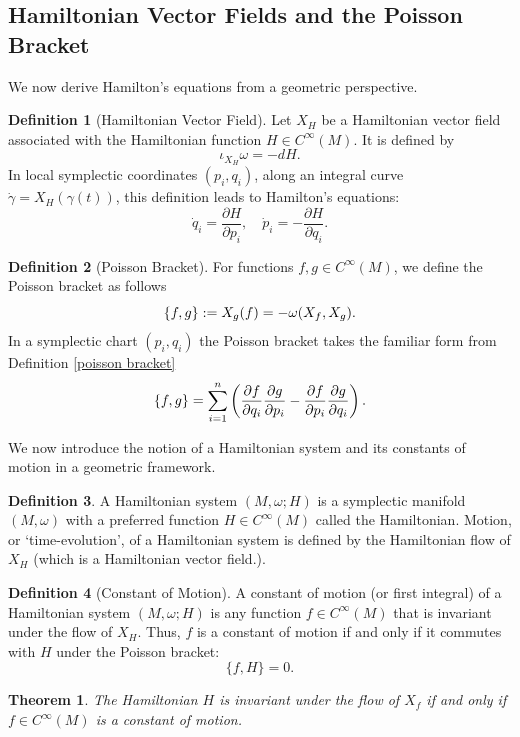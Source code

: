 \documentclass[12pt,oneside]{report}
\newtheorem{theorem}{Theorem}[section]  %
\theoremstyle{definition}
\newtheorem{definition}{Definition}
\begin{document}
\subsection{Hamiltonian Vector Fields and the Poisson Bracket}

We now derive Hamilton’s equations from a geometric perspective.

\begin{definition}[Hamiltonian Vector Field]
Let $X_{H}$ be a Hamiltonian vector field associated with the Hamiltonian function $H \in C^\infty(M)$. It is defined by $$
\iota_{X_H}\omega = -dH.
$$
In local symplectic coordinates $(p_i,q_i)$, along an integral curve $\dot{\gamma} = X_{H}(\gamma(t))$, this definition leads to Hamilton’s equations:
$$
\dot{q}_i = \frac{\partial H}{\partial p_i}, \quad \dot{p}_i = -\frac{\partial H}{\partial q_i}.
$$
\end{definition}

\begin{definition}[Poisson Bracket]
For functions $f,g\in C^\infty(M)$, we define the Poisson bracket as follows
$$
\displaystyle \left\{ f , g \right\} := X_g(f) = -\omega(X_f,X_g).
$$
In a symplectic chart $(p_i,q_i)$ the Poisson bracket takes the familiar form from Definition \ref{poisson bracket}
$$
\displaystyle \left\{ f , g \right\} = \sum_{i=1}^{n}\left(\frac{\partial f}{\partial q_i}\frac{\partial g}{\partial p_i} - \frac{\partial f}{\partial p_i}\frac{\partial g}{\partial q_i}\right).
$$
\end{definition}
We now introduce the notion of a Hamiltonian system and its constants of motion in a geometric framework.
\begin{definition}
    A Hamiltonian system $(M,\omega;H)$ is a symplectic manifold $(M,\omega)$ with a preferred function $H \in C^{\infty}(M)$ called the Hamiltonian. Motion, or `time-evolution', of a Hamiltonian system is defined by the Hamiltonian flow of $X_{H}$ (which is a Hamiltonian vector field.).
\end{definition}

\begin{definition}[Constant of Motion]
A constant of motion (or first integral) of a Hamiltonian system \( (M,\omega;H) \) is any function \( f \in C^{\infty}(M) \) that is invariant under the flow of \( X_H \). Thus, \( f \) is a constant of motion if and only if it commutes with \( H \) under the Poisson bracket:
\[
\{ f, H \} = 0.
\]
\end{definition}

\begin{theorem}
The Hamiltonian \( H \) is invariant under the flow of \( X_f \) if and only if \( f \in C^{\infty}(M) \) is a constant of motion.
\end{theorem}
\end{document}
